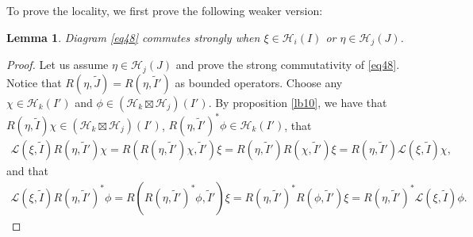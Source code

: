 \documentclass[11pt,b5paper,notitlepage]{article}
\theoremstyle{definition}
\theoremstyle{plain}
\newtheorem{lm}[df]{Lemma}
\newcommand{\mc}{\mathcal}
\newcommand{\wtd}{\widetilde}
\newcommand{\scr}{\mathscr}
\numberwithin{equation}{subsection}
\begin{document}
To prove the locality, we first prove the following weaker version:
\begin{lm}\label{lb17}
	Diagram \eqref{eq48} commutes strongly when $\xi\in\mc H_i(I)$ or $\eta\in\mc H_j(J)$.
\end{lm}

\begin{proof}
	Let us assume $\eta\in\mc H_j(J)$ and prove the strong commutativity of \eqref{eq48}. Notice that $R(\eta,\wtd J)=R(\eta,\wtd I')$ as bounded operators. Choose any $\chi\in\mc H_k(I')$ and $\phi\in(\mc H_k\boxtimes\mc H_j)(I')$. By proposition \ref{lb10}, we have that $R(\eta,\wtd I)\chi\in(\mc H_k\boxtimes\mc H_j)(I')$, $R(\eta,\wtd I')^*\phi\in\mc H_k(I')$, that
	\begin{align*}
	\scr L(\xi,\wtd I)R(\eta,\wtd I')\chi=R(R(\eta,\wtd I')\chi,\wtd I')\xi=R(\eta,\wtd I')R(\chi,\wtd I')\xi=R(\eta,\wtd I')\scr L(\xi,\wtd I)\chi,
	\end{align*}
	and that
	\begin{align*}
	\scr L(\xi,\wtd I)R(\eta,\wtd I')^*\phi=R(R(\eta,\wtd I')^*\phi,\wtd I')\xi=R(\eta,\wtd I')^*R(\phi,\wtd I')\xi=R(\eta,\wtd I')^*\scr L(\xi,\wtd I)\phi.
	\end{align*}
\end{proof}
\end{document}
